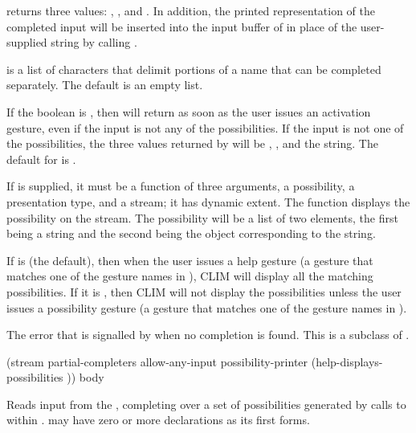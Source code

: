  returns three values: , , and
.  In addition, the printed representation of the completed input
will be inserted into the input buffer of  in place of the
user-supplied string by calling .

 is a list of characters that delimit portions of a name
that can be completed separately.  The default is an empty list.

If the boolean  is , then 
will return as soon as the user issues an activation gesture, even if the input
is not any of the possibilities.  If the input is not one of the possibilities,
the three values returned by  will be , , and
the string.  The default for  is .

If  is supplied, it must be a function of three
arguments, a possibility, a presentation type, and a stream; it has dynamic
extent.  The function displays the possibility on the stream.  The possibility
will be a list of two elements, the first being a string and the second being
the object corresponding to the string.

If  is  (the default), then when the
user issues a help gesture (a gesture that matches one of the gesture names in
), CLIM will display all the matching possibilities. If it
is , then CLIM will not display the possibilities unless the user
issues a possibility gesture (a gesture that matches one of the gesture names in
).



The error that is signalled by  when no completion is found.
This is a subclass of .


 {(stream
                                          \key partial-completers allow-any-input
                                               possibility-printer
                                               (help-displays-possibilities ))
                                         \body body}  

Reads input from the  , completing over a
set of possibilities generated by calls to  within .
 may have zero or more declarations as its first forms.


